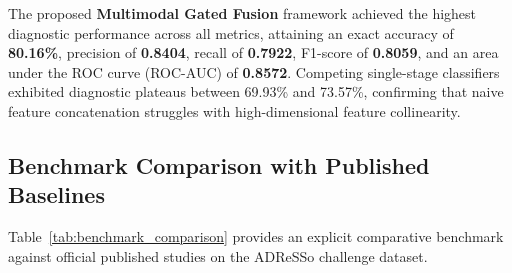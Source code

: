 \documentclass[conference]{IEEEtran}
\begin{document}
\begin{table}[htbp]
\caption{Model Evaluation Summary (5-Fold Stratified Cross-Validation)}
\label{tab:model_comparison}
\centering
{}
\end{table}

The proposed \textbf{Multimodal Gated Fusion} framework achieved the highest diagnostic performance across all metrics, attaining an exact accuracy of \textbf{80.16\%}, precision of \textbf{0.8404}, recall of \textbf{0.7922}, F1-score of \textbf{0.8059}, and an area under the ROC curve (ROC-AUC) of \textbf{0.8572}. Competing single-stage classifiers exhibited diagnostic plateaus between 69.93\% and 73.57\%, confirming that naive feature concatenation struggles with high-dimensional feature collinearity.

\subsection{Benchmark Comparison with Published Baselines}
Table~\ref{tab:benchmark_comparison} provides an explicit comparative benchmark against official published studies on the ADReSSo challenge dataset.
\end{document}
